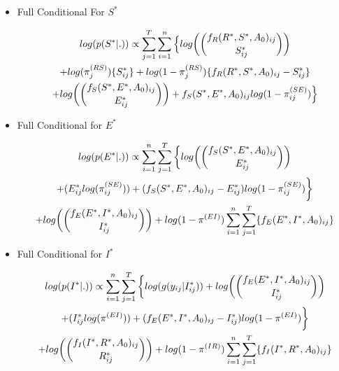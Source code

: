 \documentclass[12pt]{article}
\begin{document}
\begin{itemize}
    \item{Full Conditional For $S^*$}
    \begin{center}
        \begin{multline}
        \displaystyle
        log(p(S^*|.))\propto 
            \sum_{j=1}^T\sum_{i=1}^n\Big\{log\bigg(\dbinom{f_R(R^*, S^*, A_0)_{ij}}{S^*_{ij}}\bigg) \\ + log(\pi_j^{(RS)})\{S^*_{ij}\} + 
                log(1-\pi_j^{(RS)})\{f_R(R^*, S^*, A_0)_{ij} - S^*_{ij}\}\\ 
            + log\bigg(\dbinom{f_S(S^*, E^*, A_0)_{ij}}{E^*_{ij}}\bigg) + f_S(S^*, E^*, A_0)_{ij}log(1-\pi_{ij}^{(SE)})\Big\}
        \end{multline}
    \end{center}

    \item{Full Conditional for $E^*$}
    \begin{center}
    \begin{multline}
        \displaystyle
        log(p(E^*|.))\propto \sum_{i=1}^n \sum_{j=1}^T\bigg\{log\bigg(\dbinom{f_S(S^*, E^*, A_0)_{ij}}{E^*_{ij}}\bigg) \\ 
                + (E^*_{ij}log(\pi_{ij}^{(SE)})) + (f_S(S^*, E^*, A_0)_{ij} - E^*_{ij})log(1-\pi_{ij}^{(SE)})\bigg\} \\
                + log\bigg(\dbinom{f_E(E^*, I^*, A_0)_{ij}}{I^*_{ij}}\bigg) + log(1-\pi^{(EI)})\sum_{i=1}^n\sum_{j=1}^T\{f_E(E^*, I^*, A_0)_{ij}\}\\
    \end{multline}
    \end{center}

    \item{Full Conditional for $I^*$}
    \begin{center}
    \begin{multline}
        \displaystyle
        log(p(I^*|.))\propto \sum_{i=1}^n \sum_{j=1}^T\bigg\{log(g(y_{ij}|I^*_{ij})) + log\bigg(\dbinom{f_E(E^*, I^*, A_0)_{ij}}{I^*_{ij}}\bigg)\\
                + (I^*_{ij}log(\pi^{(EI)})) + (f_E(E^*, I^*, A_0)_{ij} - I^*_{ij})log(1-\pi^{(EI)})\bigg\} \\
                + log\bigg(\dbinom{f_I(I^*, R^*, A_0)_{ij}}{R^*_{ij}}\bigg) + log(1-\pi^{(IR)})\sum_{i=1}^n\sum_{j=1}^T\{f_I(I^*, R^*, A_0)_{ij}\}\\
    \end{multline}
    \end{center}




\end{itemize}
\end{document}
